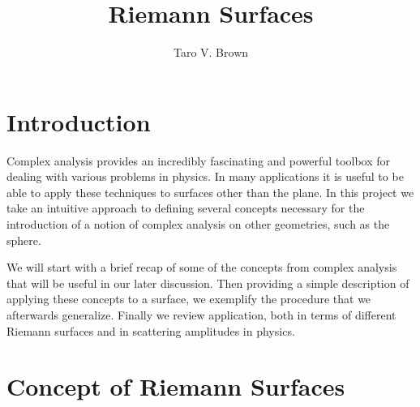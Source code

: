 \documentclass[lettersize,11pt]{article}
\title{Riemann Surfaces}
\author[a]{Taro V. Brown}
\affiliation[a]{Department of Physics, UC Davis, One Shields Avenue, Davis, CA 95616, USA }
\begin{document}
 
\maketitle
\flushbottom
\newpage
\section{Introduction}
Complex analysis provides an incredibly fascinating and powerful toolbox for dealing with various problems in physics. In many applications it is useful to be able to apply these techniques to surfaces other than the plane. In this project we take an intuitive approach to defining several concepts necessary for the introduction of a notion of complex analysis on other geometries, such as the sphere. 

We will start with a brief recap of some of the concepts from complex analysis that will be useful in our later discussion. Then providing a simple description of applying these concepts to a surface, we exemplify the procedure that we afterwards generalize. Finally we review application, both in terms of different Riemann surfaces and in scattering amplitudes in physics.
\section{Concept of Riemann Surfaces}
\end{document}
